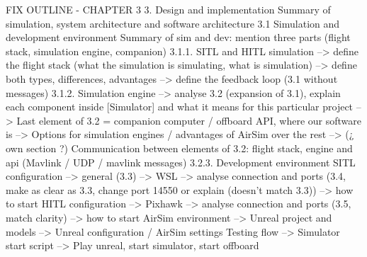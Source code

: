 FIX OUTLINE - CHAPTER 3
3. Design and implementation
Summary of simulation, system architecture and software architecture
3.1 Simulation and development environment
Summary of sim and dev: mention three parts (flight stack, simulation engine, companion)
3.1.1. SITL and HITL simulation
        --> define the flight stack (what the simulation is simulating, what is simulation)
        --> define both types, differences, advantages
        --> define the feedback loop (3.1 without messages)
3.1.2. Simulation engine
        --> analyse 3.2 (expansion of 3.1), explain each component inside [Simulator] and what it means for this particular project
        --> Last element of 3.2 = companion computer / offboard API, where our software is
        --> Options for simulation engines / advantages of AirSim over the rest
        --> (¿ own section ?) Communication between elements of 3.2: flight stack, engine and api (Mavlink / UDP / mavlink messages)
3.2.3. Development environment
    SITL configuration
        --> general (3.3)
        --> WSL
        --> analyse connection and ports (3.4, make as clear as 3.3, change port 14550 or explain (doesn't match 3.3))
        --> how to start
    HITL configuration
        --> Pixhawk
        --> analyse connection and ports (3.5, match clarity)
        --> how to start
    AirSim environment
        --> Unreal project and models
        --> Unreal configuration / AirSim settings
    Testing flow
        --> Simulator start script
        --> Play unreal, start simulator, start offboard